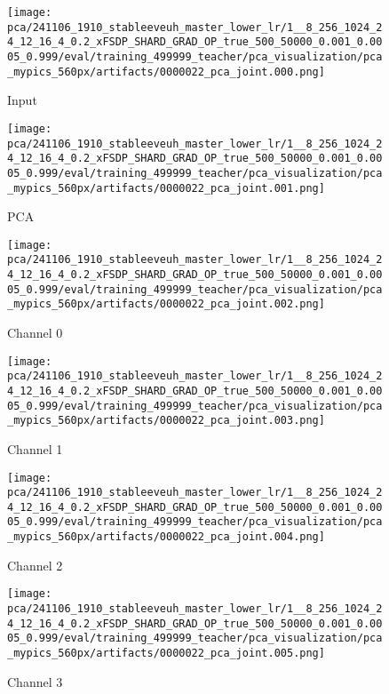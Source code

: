 \begin{figure*}[p]
    \centering
    \begin{subfigure}[t]{0.097\textwidth}
        \centering
        \caption*{Input}
        \texttt{[image: pca/241106\_1910\_stableeveuh\_master\_lower\_lr/1\_\_8\_256\_1024\_24\_12\_16\_4\_0.2\_xFSDP\_SHARD\_GRAD\_OP\_true\_500\_50000\_0.001\_0.0005\_0.999/eval/training\_499999\_teacher/pca\_visualization/pca\_mypics\_560px/artifacts/0000022\_pca\_joint.000.png]}
    \end{subfigure}\hfill
    \begin{subfigure}[t]{0.097\textwidth}
        \centering
        \caption*{PCA}
        \texttt{[image: pca/241106\_1910\_stableeveuh\_master\_lower\_lr/1\_\_8\_256\_1024\_24\_12\_16\_4\_0.2\_xFSDP\_SHARD\_GRAD\_OP\_true\_500\_50000\_0.001\_0.0005\_0.999/eval/training\_499999\_teacher/pca\_visualization/pca\_mypics\_560px/artifacts/0000022\_pca\_joint.001.png]}
    \end{subfigure}\hfill
    \begin{subfigure}[t]{0.097\textwidth}
        \centering
        \caption*{Channel 0}
        \texttt{[image: pca/241106\_1910\_stableeveuh\_master\_lower\_lr/1\_\_8\_256\_1024\_24\_12\_16\_4\_0.2\_xFSDP\_SHARD\_GRAD\_OP\_true\_500\_50000\_0.001\_0.0005\_0.999/eval/training\_499999\_teacher/pca\_visualization/pca\_mypics\_560px/artifacts/0000022\_pca\_joint.002.png]}
    \end{subfigure}\hfill
    \begin{subfigure}[t]{0.097\textwidth}
        \centering
        \caption*{Channel 1}
        \texttt{[image: pca/241106\_1910\_stableeveuh\_master\_lower\_lr/1\_\_8\_256\_1024\_24\_12\_16\_4\_0.2\_xFSDP\_SHARD\_GRAD\_OP\_true\_500\_50000\_0.001\_0.0005\_0.999/eval/training\_499999\_teacher/pca\_visualization/pca\_mypics\_560px/artifacts/0000022\_pca\_joint.003.png]}
    \end{subfigure}\hfill
    \begin{subfigure}[t]{0.097\textwidth}
        \centering
        \caption*{Channel 2}
        \texttt{[image: pca/241106\_1910\_stableeveuh\_master\_lower\_lr/1\_\_8\_256\_1024\_24\_12\_16\_4\_0.2\_xFSDP\_SHARD\_GRAD\_OP\_true\_500\_50000\_0.001\_0.0005\_0.999/eval/training\_499999\_teacher/pca\_visualization/pca\_mypics\_560px/artifacts/0000022\_pca\_joint.004.png]}
    \end{subfigure}\hfill
    \begin{subfigure}[t]{0.097\textwidth}
        \centering
        \caption*{Channel 3}
        \texttt{[image: pca/241106\_1910\_stableeveuh\_master\_lower\_lr/1\_\_8\_256\_1024\_24\_12\_16\_4\_0.2\_xFSDP\_SHARD\_GRAD\_OP\_true\_500\_50000\_0.001\_0.0005\_0.999/eval/training\_499999\_teacher/pca\_visualization/pca\_mypics\_560px/artifacts/0000022\_pca\_joint.005.png]}

\end{subfigure}
\end{figure*}
